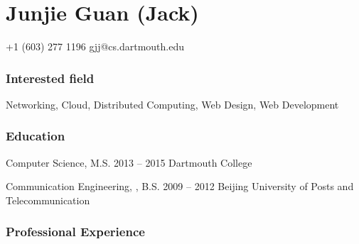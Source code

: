 \documentclass{tccv}
\begin{document}
\part{Junjie Guan (Jack)}

\begin{multicols}{2}

    {+1 (603) 277 1196}
    {gjj@cs.dartmouth.edu}

\section{Interested field}
Networking, Cloud, Distributed Computing, \newline Web Design, Web Development


\section{Education}

\begin{yearlist}

\item[Computer Science, M.S.]{2013 -- 2015}
     {Dartmouth College}

\item[Communication Engineering, , B.S.]{2009 -- 2012}
     {Beijing University of Posts and Telecommunication}

\end{yearlist}

\end{multicols}















\section{Professional Experience}
\end{document}
